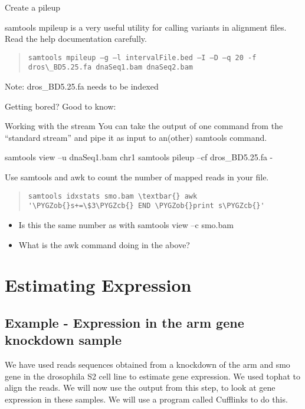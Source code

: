 \documentclass[letterpaper,10pt,english]{sphinxmanual}
\def\PYGZob{\char`\{}
\def\PYGZcb{\char`\}}
\begin{document}
Create a pileup

samtools mpileup is a very useful utility for calling variants in alignment files. Read the help documentation carefully.
\begin{quote}

\begin{Verbatim}[commandchars=\\\{\}]
samtools mpileup –g –l intervalFile.bed –I –D –q 20 -f dros\_BD5.25.fa dnaSeq1.bam dnaSeq2.bam
\end{Verbatim}
\end{quote}

Note: dros\_BD5.25.fa needs to be indexed

Getting bored? Good to know:

Working with the stream
You can take the output of one command from the “standard stream” and pipe it as input to an(other) samtools command.

samtools view –u dnaSeq1.bam chr1 \textbar{} samtools pileup –cf dros\_BD5.25.fa -

Use samtools and awk to count the number of mapped reads in your file.
\begin{quote}

\begin{Verbatim}[commandchars=\\\{\}]
samtools idxstats smo.bam \textbar{} awk '\PYGZob{}s+=\$3\PYGZcb{} END \PYGZob{}print s\PYGZcb{}'
\end{Verbatim}
\end{quote}
\begin{itemize}
\item {} 
Is this the same number as with samtools view –c smo.bam

\item {} 
What is the awk command doing in the above?

\end{itemize}


\chapter{Estimating Expression}
\label{STEP4_CUFFLINKS_DE::doc}\label{STEP4_CUFFLINKS_DE:estimating-expression}

\section{Example - Expression in the arm gene knockdown sample}
\label{STEP4_CUFFLINKS_DE:example-expression-in-the-arm-gene-knockdown-sample}
We have used reads sequences obtained from a knockdown of the arm and smo gene in the drosophila S2 cell line to estimate gene expression. We used tophat to align the reads.  We will now use the output from this step, to look at gene expression in these samples. We will use a program called Cufflinks to do this.
\end{document}
